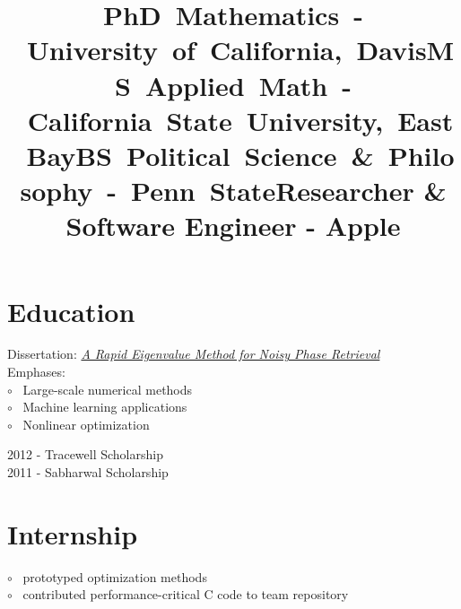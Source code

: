 \documentclass[12pt,margintitle,line]{res}
\newcommand{\CC}{C\nolinebreak\hspace{-.05em}\raisebox{.4ex}{\scriptsize\bf +}\nolinebreak\hspace{-.10em}\raisebox{.4ex}{\scriptsize\bf +} }
\def\CC{{C\nolinebreak[4]\hspace{-.05em}\raisebox{.4ex}{\scriptsize\bf ++}}}
\begin{document}
\begin{resume}


\vspace{-0.7cm}

\section{Education}

\vspace{-0.5cm}
\title{\mbox{PhD  Mathematics - University of California, Davis}}
\dates{}
\begin{position}
Dissertation: 
\href{https://github.com/Will-Wright/dissertation-rapid_eigenvalue_method_for_noisy_phase_retrieval/blob/master/will_wright_dissertation.pdf} {\textsl{A Rapid Eigenvalue Method for Noisy Phase Retrieval}}
	\\
Emphases: 
	\\
$\circ$ \ Large-scale numerical methods
	\\
$\circ$ \ Machine learning applications
	\\
$\circ$ \ Nonlinear optimization
\end{position}


\vspace{-0.5cm}
\title{\mbox{MS  Applied Math - California State University, East Bay}}
\dates{}
\begin{position}
2012 - Tracewell Scholarship
	\\
2011 - Sabharwal Scholarship
\end{position}


\vspace{-0.5cm}
\title{\mbox{BS  Political Science \& Philosophy - Penn State}}
\dates{}
\begin{position}
\end{position}







\vspace{-0.7cm}

\section{Internship}

\vspace{-0.5cm}
\title{Researcher \& Software Engineer - Apple}
\dates{}
\begin{position}
$\circ$ \ prototyped optimization methods \\
$\circ$ \ contributed performance-critical \CC \hspace{-0.02cm} code to team repository 
\end{position}




\end{resume}
\end{document}
